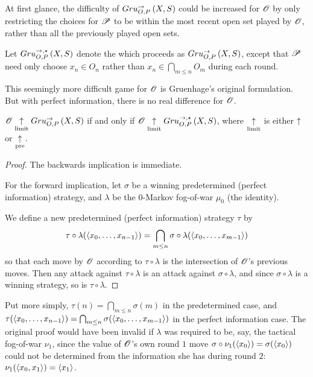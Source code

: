 At first glance, the difficulty of $Gru_{O,P}^{\to}\left({X},{S}\right)$ could be increased for
$\mathscr{O}$ by only restricting the choices for $\mathscr{P}$ to be within the most
recent open set played by $\mathscr{O}$, rather than all the previously played
open sets.

\begin{defn}
  Let $Gru_{O,P}^{\to,\star}\left({X},{S}\right)$ denote the  which
  proceeds as $Gru_{O,P}^{\to}\left({X},{S}\right)$, except that $\mathscr{P}$ need only choose
  $x_n\in O_n$ rather than $x_n\in \bigcap_{m\leq n}O_m$ during each round.
\end{defn}

This seemingly more difficult game for $\mathscr{O}$ is Gruenhage's original
formulation. But with perfect information, there is no real difference for
$\mathscr{O}$.

\begin{prop}\label{propNormalHardCon}
  $\mathscr{O} \underset{\text{limit}}{\uparrow} Gru_{O,P}^{\to}\left({X},{S}\right)$
    if and only if
  $\mathscr{O} \underset{\text{limit}}{\uparrow} Gru_{O,P}^{\to,\star}\left({X},{S}\right)$,
  where $\underset{\text{limit}}{\uparrow}$ is either $\uparrow$ or $\underset{\text{pre}}{\uparrow}$.
\end{prop}

\begin{proof}
  The backwards implication is immediate.

  For the forward implication, let $\sigma$ be a winning predetermined
  (perfect information) strategy, and $\lambda$ be the $0$-Markov
  fog-of-war $\mu_0$ (the identity).

  We define a new predetermined (perfect information) strategy $\tau$ by
    \[
      \tau\circ\lambda(\langle x_0,\dots,x_{n-1}\rangle)
        =
      \bigcap_{m\leq n}\sigma\circ\lambda(\langle x_0,\dots,x_{m-1}\rangle)
    \]
  so that each move by $\mathscr{O}$ according to $\tau\circ\lambda$ is the
  intersection of $\mathscr{O}$'s previous moves. Then any attack against
  $\tau\circ\lambda$ is an attack against $\sigma\circ\lambda$, and since
  $\sigma\circ\lambda$ is a winning strategy, so is $\tau\circ\lambda$.
\end{proof}

Put more simply, $\tau(n)=\bigcap_{m\leq n}\sigma(m)$ in the predetermined
case, and
$\tau(\langle x_0,\dots,x_{n-1}\rangle)=\bigcap_{m\leq n}\sigma(\langle x_0,\dots,x_{m-1}\rangle)$
in the perfect information case.
The original proof would have been invalid if $\lambda$ was required to be, say,
the tactical fog-of-war $\nu_1$, since the value of $\mathscr{O}$'s own round $1$ move
$\sigma\circ\nu_1(\langle x_0\rangle)=\sigma(\langle x_0\rangle)$
could not be determined from the information she has during round
$2$: $\nu_1(\langle x_0,x_1\rangle)=\langle x_1\rangle$.

